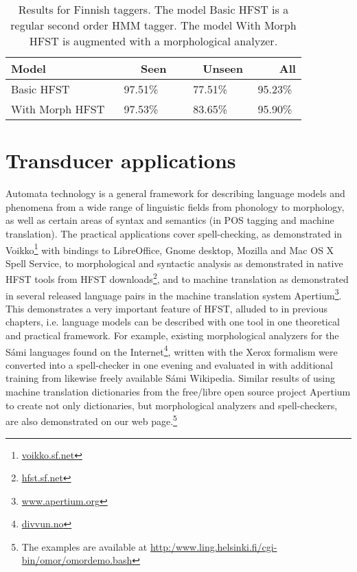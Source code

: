 \documentclass{llncs}
\begin{document}
\begin{table}
  \caption{Results for Finnish taggers. The model Basic HFST is a
    regular second order HMM tagger. The model With Morph HFST is
    augmented with a morphological analyzer.}\label{fin-tagging-acc}
  \begin{center}
    \begin{tabular}{lccc}
      \hline 
      Model            & ~~~~Seen & ~~~~Unseen & ~~~~All \\
      \hline 
      Basic HFST       &  97.51\% &    77.51\% & 95.23\% \\
      With Morph HFST  &  97.53\% &    83.65\% & 95.90\% \\
      \hline
    \end{tabular}
  \end{center}
\end{table}


\section{Transducer applications}\label{Applications}



Automata technology is a general framework for describing language models
and phenomena from a wide range of linguistic fields from phonology to
morphology, as well as certain areas of syntax and semantics (in POS tagging and
machine translation).  The practical applications cover spell-checking, 
as demonstrated in Voikko\footnote{\url{voikko.sf.net}} with
bindings to LibreOffice, Gnome desktop, Mozilla and Mac OS X Spell Service, to
morphological and syntactic analysis as demonstrated in native HFST tools
from HFST downloads\footnote{\url{hfst.sf.net}}, and to machine translation as demonstrated in
several released language pairs in the machine translation system
Apertium\footnote{\url{www.apertium.org}}. This demonstrates a very important feature of HFST,
alluded to in previous chapters, i.e. language models can be
described with one tool in one theoretical and practical framework. For example,
existing morphological analyzers for the Sámi languages found on the
Internet\footnote{\url{divvun.no}}, written with the Xerox formalism were converted into a spell-checker 
in one evening and evaluated in \cite{pirinen/2010/lrec} with additional training from likewise freely
available Sámi Wikipedia. Similar results of using machine translation
dictionaries from the free/libre open source project
Apertium to create not only
dictionaries, but morphological analyzers and spell-checkers, are also
demonstrated on our web page.\footnote{The examples are available at
  \url{http:/www.ling.helsinki.fi/cgi-bin/omor/omordemo.bash}}
\end{document}
